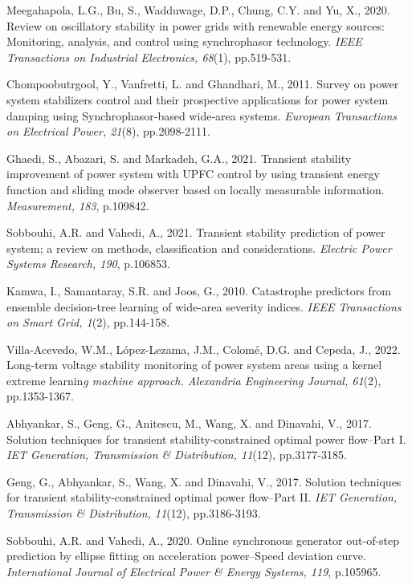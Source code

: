 \begin{thebibliography}{99}
\begin{singlespace}
 Meegahapola, L.G., Bu, S., Wadduwage, D.P., Chung, C.Y. and Yu, X., 2020. Review on oscillatory stability in power grids with renewable energy sources: Monitoring, analysis, and control using synchrophasor technology. \textit{IEEE Transactions on Industrial Electronics, 68}(1), pp.519-531.

 Chompoobutrgool, Y., Vanfretti, L. and Ghandhari, M., 2011. Survey on power system stabilizers control and their prospective applications for power system damping using Synchrophasor‐based wide‐area systems. \textit{European Transactions on Electrical Power, 21}(8), pp.2098-2111.

 Ghaedi, S., Abazari, S. and Markadeh, G.A., 2021. Transient stability improvement of power system with UPFC control by using transient energy function and sliding mode observer based on locally measurable information. \textit{Measurement, 183}, p.109842.

 Sobbouhi, A.R. and Vahedi, A., 2021. Transient stability prediction of power system; a review on methods, classification and considerations. \textit{Electric Power Systems Research, 190}, p.106853.

 Kamwa, I., Samantaray, S.R. and Joos, G., 2010. Catastrophe predictors from ensemble decision-tree learning of wide-area severity indices. \textit{IEEE Transactions on Smart Grid, 1}(2), pp.144-158.

 Villa-Acevedo, W.M., López-Lezama, J.M., Colomé, D.G. and Cepeda, J., 2022. Long-term voltage stability monitoring of power system areas using a kernel extreme learnin\textit{g machine approach. Alexandria Engineering Journal, 61}(2), pp.1353-1367.


 Abhyankar, S., Geng, G., Anitescu, M., Wang, X. and Dinavahi, V., 2017. Solution techniques for transient stability-constrained optimal power flow–Part I. \textit{IET Generation, Transmission \& Distribution, 11}(12), pp.3177-3185.

 Geng, G., Abhyankar, S., Wang, X. and Dinavahi, V., 2017. Solution techniques for transient stability-constrained optimal power flow–Part II. \textit{IET Generation, Transmission \& Distribution, 11}(12), pp.3186-3193.




 Sobbouhi, A.R. and Vahedi, A., 2020. Online synchronous generator out-of-step prediction by ellipse fitting on acceleration power–Speed deviation curve. \textit{International Journal of Electrical Power \& Energy Systems, 119}, p.105965.


\end{singlespace}
\end{thebibliography}
